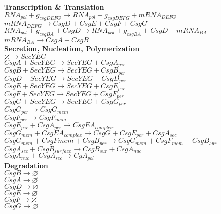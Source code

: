 \documentclass[11pt, oneside]{article}   	%
\begin{document}
\begin{center}

\textbf{Transcription \& Translation} \\
$RNA_{pol} + g_{csgDEFG} \rightarrow RNA_{pol} + g_{csgDEFG} + mRNA_{DEFG}$ \\
$mRNA_{DEFG} \rightarrow CsgD + CsgE + CsgF + CsgG$ \\
$RNA_{pol} + g_{csgBA} + CsgD \rightarrow RNA_{pol} + g_{csgBA} + CsgD + mRNA_{BA} $ \\
$mRNA_{BA} \rightarrow CsgA + CsgB$ \\ 
\hfill \break
\textbf{Secretion, Nucleation, Polymerization} \\
$\varnothing \rightarrow SecYEG$ \\
$CsgA + SecYEG \rightarrow SecYEG + CsgA_{per}$ \\
$CsgB + SecYEG \rightarrow SecYEG + CsgB_{per}$ \\
$CsgD + SecYEG \rightarrow SecYEG + CsgD_{per}$ \\
$CsgE + SecYEG \rightarrow SecYEG + CsgE_{per}$ \\
$CsgF + SecYEG \rightarrow SecYEG + CsgF_{per}$ \\
$CsgG + SecYEG \rightarrow SecYEG + CsgG_{per}$ \\
$CsgG_{per} \rightarrow CsgG_{mem}$ \\
$CsgF_{per} \rightarrow CsgF_{mem}$ \\
$CsgE_{per} + CsgA_{per} \rightarrow CsgEA_{complex}$ \\
$CsgG_{mem} + CsgEA_{complex} \rightarrow CsgG + CsgE_{per} + CsgA_{sec}$ \\
$CsgG_{mem} + CsgF{mem} + CsgB_{per} \rightarrow CsgG_{mem} + CsgF_{mem} + CsgB_{sur}$ \\
$CsgA_{sec} + CsgB_{surface} \rightarrow CsgB_{sur} + CsgA_{nuc}$ \\ 
$CsgA_{nuc} + CsgA_{sec} \rightarrow CgA_{pol}$ \\

\hfill \break
\textbf{Degradation} \\
$CsgB \rightarrow \varnothing$ \\ 
$CsgA \rightarrow \varnothing$ \\
$CsgD \rightarrow \varnothing$ \\
$CsgE \rightarrow \varnothing$ \\
$CsgF \rightarrow \varnothing$ \\
$CsgG \rightarrow \varnothing$ \\


\end{center}
\end{document}
